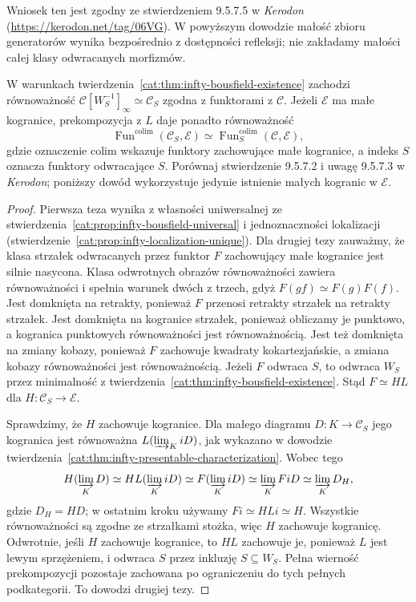 Wniosek ten jest zgodny ze stwierdzeniem 9.5.7.5 w \emph{Kerodon} (\url{https://kerodon.net/tag/06VG}). W powyższym dowodzie małość zbioru generatorów wynika bezpośrednio z dostępności refleksji; nie zakładamy małości całej klasy odwracanych morfizmów.

\begin{wniosek}\label{cat:cor:infty-bousfield-as-localization}
W warunkach twierdzenia~\ref{cat:thm:infty-bousfield-existence} zachodzi równoważność $\mathcal C[W_S^{-1}]_\infty\simeq\mathcal C_S$ zgodna z funktorami z $\mathcal C$. Jeżeli $\mathcal E$ ma małe kogranice, prekompozycja z $L$ daje ponadto równoważność
\[
 \operatorname{Fun}^{\mathrm{colim}}(\mathcal C_S,\mathcal E)
 \simeq
 \operatorname{Fun}^{\mathrm{colim}}_S(\mathcal C,\mathcal E),
\]
gdzie oznaczenie $\mathrm{colim}$ wskazuje funktory zachowujące małe kogranice, a indeks $S$ oznacza funktory odwracające $S$. Porównaj stwierdzenie 9.5.7.2 i uwagę 9.5.7.3 w \emph{Kerodon}; poniższy dowód wykorzystuje jedynie istnienie małych kogranic w $\mathcal E$.
\end{wniosek}
\begin{proof}
Pierwsza teza wynika z własności uniwersalnej ze stwierdzenia~\ref{cat:prop:infty-bousfield-universal} i jednoznaczności lokalizacji (stwierdzenie~\ref{cat:prop:infty-localization-unique}). Dla drugiej tezy zauważmy, że klasa strzałek odwracanych przez funktor $F$ zachowujący małe kogranice jest silnie nasycona. Klasa odwrotnych obrazów równoważności zawiera równoważności i spełnia warunek dwóch z trzech, gdyż $F(gf)\simeq F(g)F(f)$. Jest domknięta na retrakty, ponieważ $F$ przenosi retrakty strzałek na retrakty strzałek. Jest domknięta na kogranice strzałek, ponieważ obliczamy je punktowo, a kogranica punktowych równoważności jest równoważnością. Jest też domknięta na zmiany kobazy, ponieważ $F$ zachowuje kwadraty kokartezjańskie, a zmiana kobazy równoważności jest równoważnością. Jeżeli $F$ odwraca $S$, to odwraca $W_S$ przez minimalność z twierdzenia~\ref{cat:thm:infty-bousfield-existence}. Stąd $F\simeq HL$ dla $H:\mathcal C_S\to\mathcal E$.

Sprawdzimy, że $H$ zachowuje kogranice. Dla małego diagramu $D:K\to\mathcal C_S$ jego kogranica jest równoważna $L(\varinjlim_K iD)$, jak wykazano w dowodzie twierdzenia~\ref{cat:thm:infty-presentable-characterization}. Wobec tego
\[
 H(\varinjlim_K D)
 \simeq HL(\varinjlim_K iD)
 \simeq F(\varinjlim_K iD)
 \simeq\varinjlim_K FiD
 \simeq\varinjlim_K D_H,
\]
gdzie $D_H=HD$; w ostatnim kroku używamy $Fi\simeq HLi\simeq H$. Wszystkie równoważności są zgodne ze strzałkami stożka, więc $H$ zachowuje kogranicę. Odwrotnie, jeśli $H$ zachowuje kogranice, to $HL$ zachowuje je, ponieważ $L$ jest lewym sprzężeniem, i odwraca $S$ przez inkluzję $S\subseteq W_S$. Pełna wierność prekompozycji pozostaje zachowana po ograniczeniu do tych pełnych podkategorii. To dowodzi drugiej tezy.
\end{proof}

